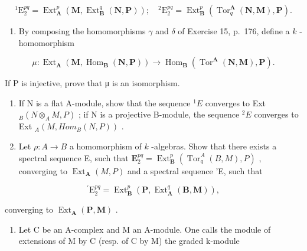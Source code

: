 \[
{ } ^ { 1 } \mathrm{E} _ { 2 } ^ { p q } = \operatorname{Ext} _ { \mathbf { A } } ^ { p } ( \mathbf { M } , \operatorname{Ext} _ { \mathbf { B } } ^ { q } ( \mathbf { N } , \mathbf { P } ) ) ; \quad { } ^ { 2 } \mathrm{E} _ { 2 } ^ { p q } = \operatorname{Ext} _ { \mathbf { B } } ^ { p } ( \operatorname{Tor} _ { q } ^ { \mathbf { A } } ( \mathbf { N } , \mathbf { M } ) , \mathbf { P } ) .
\]

\begin{enumerate}
\def\labelenumi{\alph{enumi})}
\setcounter{enumi}{1}
\tightlist
\item
  By composing the homomorphisms \(\gamma\) and \(\delta\) of Exercise 15, p.~176, define a \(k\) -homomorphism
\end{enumerate}

\[
\mu : \operatorname{Ext} _ {\mathbf {A}} (\mathbf {M}, \operatorname{Hom} _ {\mathbf {B}} (\mathbf {N}, \mathbf {P})) \rightarrow \operatorname{Hom} _ {\mathbf {B}} \left(\operatorname{Tor} ^ {\mathbf {A}} (\mathbf {N}, \mathbf {M}), \mathbf {P}\right).
\]

If P is injective, prove that μ is an isomorphism.

\begin{enumerate}
\def\labelenumi{\alph{enumi})}
\setcounter{enumi}{2}
\item
  If N is a flat A-module, show that the sequence \({}^{1}E\) converges to Ext \(_{B}(N \otimes_{A} M, P)\) ; if N is a projective B-module, the sequence \({}^{2}E\) converges to Ext \(_{A}(M, Hom_{B}(N, P))\) .
\item
  Let \(\rho: A \to B\) a homomorphism of \(k\) -algebras. Show that there exists a spectral sequence E, such that \(\mathbf{E}_2^{pq} = \operatorname{Ext}_{\mathbf{B}}^p (\operatorname{Tor}_q^A(B, M), P)\) , converging to \(\operatorname{Ext}_{\mathbf{A}}(M, P)\) and a spectral sequence 'E, such that
\end{enumerate}

\[
{ } ^ { \prime } \mathrm{E} _ { 2 } ^ { p q } = \operatorname{Ext} _ { \mathbf { B } } ^ { p } ( \mathbf { P } , \operatorname{Ext} _ { \mathbf { A } } ^ { q } ( \mathbf { B } , \mathbf { M } ) ) ,
\]

converging to \(\operatorname{Ext}_{\mathbf{A}}(\mathbf{P}, \mathbf{M})\) .

\begin{enumerate}
\def\labelenumi{\arabic{enumi})}
\setcounter{enumi}{6}
\tightlist
\item
  Let C be an A-complex and M an A-module. One calls the module of extensions of M by C (resp. of C by M) the graded k-module
\end{enumerate}

